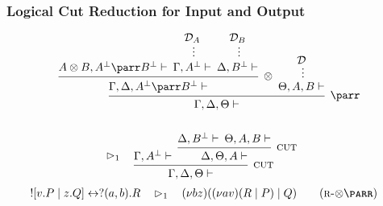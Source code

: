 \documentclass[11pt, aspectratio=169, xcolor={dvipsnames}, usepdftitle=false]{beamer}
\begin{document}
\begin{frame}
  \frametitle{Logical Cut Reduction for Input and Output}
  \begin{equation*}
      \begin{aligned}
        &\begin{prooftree}[separation=0.5em]
            \hypo{A \otimes B, A^\bot \parr B^\bot \vdash}
            \hypo{\mathcal{D}_A}
            \ellipsis{}{\Gamma, A^\bot \vdash}
            \hypo{\mathcal{D}_B}
            \ellipsis{}{\Delta, B^\bot \vdash}
            \infer3[$\otimes$]{\Gamma, \Delta, A^\bot \parr B^\bot \vdash}
            \hypo{\mathcal{D}}
            \ellipsis{}{\Theta, A, B \vdash}
            \infer2[$\parr$]{\Gamma, \Delta, \Theta \vdash}
          \end{prooftree}
        \\ \\
        &\qquad\qquad\contr\quad
        \begin{prooftree}[separation=0.5em]
          \hypo{\Gamma, A^\bot \vdash}
          \hypo{\Delta, B^\bot \vdash}
          \hypo{\Theta, A, B \vdash}
          \infer2[\textsc{cut}]{\Delta, \Theta, A \vdash}
          \infer2[\textsc{cut}]{\Gamma, \Delta, \Theta \vdash}
        \end{prooftree}
      \end{aligned}
  \end{equation*}
  \vspace{-1em}
  \begin{align}
    \link{\ssend{v.P}{z.Q}}{\sreceive{a}{b}{R}}
    &\quad\contr\quad \parcomp{b}{z}{\parcomp{a}{v}{R}{P}}{Q}
    \tag{\textsc{r-$\otimes\parr$}}
  \end{align}
\end{frame}
\end{document}
